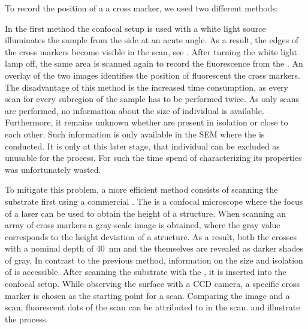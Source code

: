 		To record the position of a \nd \wrt a cross marker, we used two different methods:

		In the first method the confocal setup is used with a white light source illuminates the sample from the side at an acute angle. As a result, the edges of the cross markers become visible in the \fl scan, see . After turning the white light lamp off, the same area is scanned again to record the fluorescence from the \sivs. An overlay of the two images identifies the position of fluorescent \sivs \wrt the cross markers. The disadvantage of this method is the increased time consumption, as every scan for every subregion of the sample has to be performed twice. As only \fl scans are performed, no information about the size of individual \nds is available. Furthermore, it remains unknown whether \nds are present in isolation or close to each other. Such information is only available in the SEM where the \pp is conducted. It is only at this later stage, that individual \nds can be excluded as unusable for the \pp process. For such \nds the time spend of characterizing its properties was unfortunately wasted.

		To mitigate this problem, a more efficient method consists of scanning the substrate first using a commercial \lsm. The \lsm is a confocal microscope where the focus of a laser can be used to obtain the height of a structure. When scanning an array of cross markers a gray-scale image is obtained, where the gray value corresponds to the height deviation of a structure. As a result, both the crosses with a nominal depth of \SI{40}{\nm} and the \nds themselves are revealed as darker shades of gray. In contrast to the previous method, information on the size and isolation of \nds is accessible. After scanning the substrate with the \lsm, it is inserted into the confocal setup. While observing the surface with a CCD camera, a specific cross marker is chosen as the starting point for a \fl scan. Comparing the \lsm image and a \fl scan, fluorescent dots of the \fl scan can be attributed to \nds in the \lsm scan.  and  illustrate the process.

